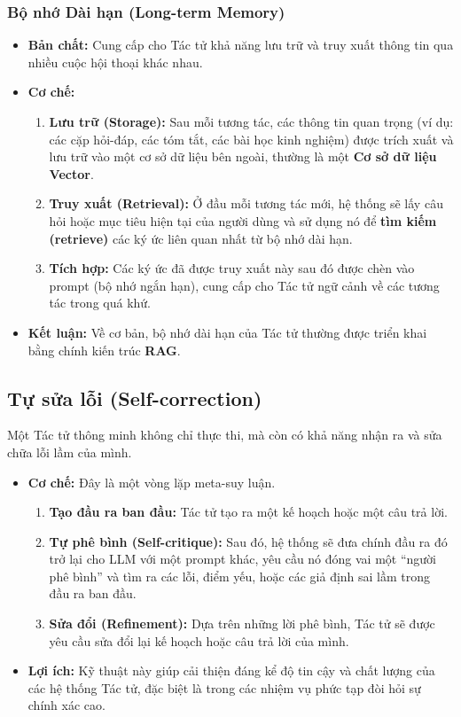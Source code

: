 \subsubsection{Bộ nhớ Dài hạn (Long-term Memory)}
\begin{itemize}
    \item \textbf{Bản chất:} Cung cấp cho Tác tử khả năng lưu trữ và truy xuất thông tin qua nhiều cuộc hội thoại khác nhau.
    \item \textbf{Cơ chế:}
        \begin{enumerate}
            \item \textbf{Lưu trữ (Storage):} Sau mỗi tương tác, các thông tin quan trọng (ví dụ: các cặp hỏi-đáp, các tóm tắt, các bài học kinh nghiệm) được trích xuất và lưu trữ vào một cơ sở dữ liệu bên ngoài, thường là một \textbf{Cơ sở dữ liệu Vector}.
            \item \textbf{Truy xuất (Retrieval):} Ở đầu mỗi tương tác mới, hệ thống sẽ lấy câu hỏi hoặc mục tiêu hiện tại của người dùng và sử dụng nó để \textbf{tìm kiếm (retrieve)} các ký ức liên quan nhất từ bộ nhớ dài hạn.
            \item \textbf{Tích hợp:} Các ký ức đã được truy xuất này sau đó được chèn vào prompt (bộ nhớ ngắn hạn), cung cấp cho Tác tử ngữ cảnh về các tương tác trong quá khứ.
        \end{enumerate}
    \item \textbf{Kết luận:} Về cơ bản, bộ nhớ dài hạn của Tác tử thường được triển khai bằng chính kiến trúc \textbf{RAG}.
\end{itemize}

\subsection{Tự sửa lỗi (Self-correction)}
\label{ssec:self_correction}
Một Tác tử thông minh không chỉ thực thi, mà còn có khả năng nhận ra và sửa chữa lỗi lầm của mình.
\begin{itemize}
    \item \textbf{Cơ chế:} Đây là một vòng lặp meta-suy luận.
        \begin{enumerate}
            \item \textbf{Tạo đầu ra ban đầu:} Tác tử tạo ra một kế hoạch hoặc một câu trả lời.
            \item \textbf{Tự phê bình (Self-critique):} Sau đó, hệ thống sẽ đưa chính đầu ra đó trở lại cho LLM với một prompt khác, yêu cầu nó đóng vai một “người phê bình” và tìm ra các lỗi, điểm yếu, hoặc các giả định sai lầm trong đầu ra ban đầu.
            \item \textbf{Sửa đổi (Refinement):} Dựa trên những lời phê bình, Tác tử sẽ được yêu cầu sửa đổi lại kế hoạch hoặc câu trả lời của mình.
        \end{enumerate}
    \item \textbf{Lợi ích:} Kỹ thuật này giúp cải thiện đáng kể độ tin cậy và chất lượng của các hệ thống Tác tử, đặc biệt là trong các nhiệm vụ phức tạp đòi hỏi sự chính xác cao.
\end{itemize}

